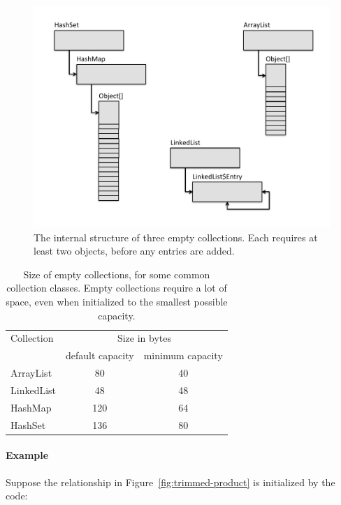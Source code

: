 


 \begin{figure}
  \centering
 \includegraphics[width=.80\textwidth]{part1/Figures/collections/inside-empty.pdf}
  \caption{The internal structure of three empty collections. Each
  requires at least two objects, before any entries are added.}
  \label{fig:inside-empty}
\end{figure}

\begin{table}
\centering
 		\begin{tabular}{lcc}
 		\toprule
	 	 Collection & \multicolumn{2}{c}{Size in bytes} \\
	 	 & default capacity & minimum capacity \\
	 	 \midrule
	 	ArrayList & 80 & 40 \\
 		LinkedList & 48 & 48 \\
 		HashMap & 120 & 64 \\
 		HashSet & 136 & 80 \\
	 	\bottomrule
	 	\end{tabular}
	\caption{Size of empty collections, for some common
	collection classes.
	Empty collections require a lot of space, even when initialized to the smallest
	possible capacity.}
	\label{tab:empty-collection-costs}
\end{table}

\paragraph{Example} Suppose the relationship
in Figure~\ref{fig:trimmed-product} is initialized by the code:

